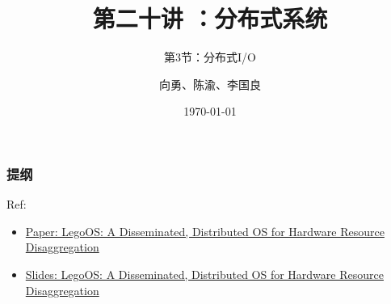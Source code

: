 


\title[第20讲]{第二十讲 ：分布式系统} %
\subtitle{第3节：分布式I/O}
\author{向勇、陈渝、李国良} %
\date{\today} %


    
\begin{frame}
    \titlepage %
\end{frame}

\begin{frame}
    \frametitle{提纲} %
    \tableofcontents %
    
    Ref:
        \begin{itemize}
            \item \href{https://www.usenix.org/system/files/osdi18-shan.pdf}{Paper: LegoOS: A Disseminated, Distributed OS for Hardware Resource Disaggregation}
            \item \href{https://www.usenix.org/sites/default/files/conference/protected-files/osdi18_slides_shan.pdf}{Slides: LegoOS: A Disseminated, Distributed OS for Hardware Resource Disaggregation}
        \end{itemize}
    
\end{frame}
